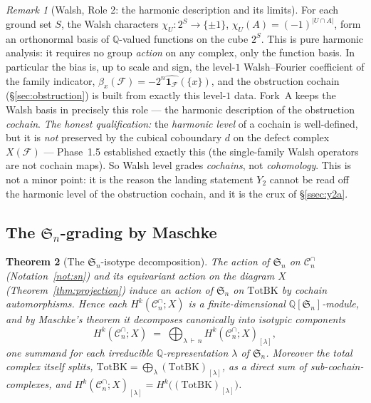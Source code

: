 \documentclass[11pt,oneside]{amsart}
\theoremstyle{plain}
\newtheorem{theorem}{Theorem}[section]
\theoremstyle{definition}
\theoremstyle{remark}
\newtheorem{remark}[theorem]{Remark}
\theoremstyle{honeststyle}
\newcommand{\F}{\mathcal{F}}
\newcommand{\bias}{\beta}
\newcommand{\Sym}{\mathfrak{S}}
\newcommand{\Q}{\mathbb{Q}}
\newcommand{\Cn}{\mathcal{C}^{\cap}_n}
\newcommand{\BK}{\mathrm{BK}}
\newcommand{\Tot}{\mathrm{Tot}}
\newcommand{\walsh}[1]{\chi_{#1}}
\begin{document}
\begin{remark}[Walsh, Role 2: the harmonic description and its limits]
\label{rem:walsh-role2}
For each ground set $S$, the Walsh characters
$\walsh{U}\colon2^{S}\to\{\pm1\}$, $\walsh{U}(A)=(-1)^{|U\cap A|}$,
form an orthonormal basis of $\Q$-valued functions on the cube $2^S$.
This is pure harmonic analysis: it requires no group \emph{action} on
any complex, only the function basis. In particular the bias is, up to
scale and sign, the level-$1$ Walsh--Fourier coefficient of the family
indicator, $\bias_x(\F)=-2^{n}\widehat{\mathbf1_\F}(\{x\})$, and the
obstruction cochain (\S\ref{sec:obstruction}) is built from exactly
this level-$1$ data. Fork~A keeps the Walsh basis in precisely this
role --- the harmonic description of the obstruction \emph{cochain}.
\emph{The honest qualification:} the \emph{harmonic level} of a
cochain is well-defined, but it is \emph{not} preserved by the cubical
coboundary $d$ on the defect complex $X(\F)$ --- Phase~1.5 established
exactly this (the single-family Walsh operators are not cochain maps).
So Walsh level grades \emph{cochains}, not \emph{cohomology}. This is
not a minor point: it is the reason the landing statement $Y_2$ cannot
be read off the harmonic level of the obstruction cochain, and it is
the crux of \S\ref{ssec:y2a}.
\end{remark}

\subsection{The $\Sym_n$-grading by Maschke}
\label{ssec:maschke}

\begin{theorem}[The $\Sym_n$-isotype decomposition]
\label{thm:maschke}
The action of $\Sym_n$ on $\Cn$ (Notation~\ref{not:sn}) and its
equivariant action on the diagram $X$ (Theorem~\ref{thm:projection})
induce an action of $\Sym_n$ on $\Tot\BK$ by cochain automorphisms.
Hence each $H^{k}(\Cn;X)$ is a finite-dimensional $\Q[\Sym_n]$-module,
and by Maschke's theorem it decomposes canonically into isotypic
components
\[
  H^{k}(\Cn;X)\;=\;\bigoplus_{\lambda\,\vdash\,n}
  H^{k}(\Cn;X)_{[\lambda]},
\]
one summand for each irreducible $\Q$-representation $\lambda$ of
$\Sym_n$. Moreover the total complex itself splits, $\Tot\BK=
\bigoplus_{\lambda}(\Tot\BK)_{[\lambda]}$, as a direct sum of
sub-cochain-complexes, and $H^{k}(\Cn;X)_{[\lambda]}=
H^{k}\bigl((\Tot\BK)_{[\lambda]}\bigr)$.
\end{theorem}
\end{document}
